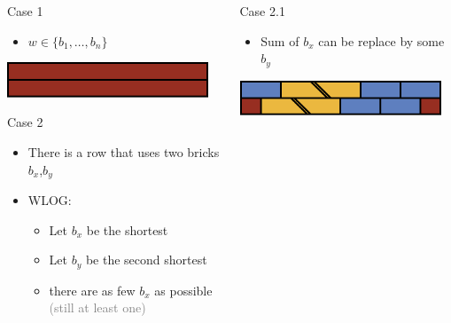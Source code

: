 \begin{frame}
	\frametitle{\problemtitle}
	\begin{columns}
		\begin{column}{0.4643\textwidth}
			\begin{block}{Case 1}
				\begin{itemize}
					\item $w\in\{b_1,\dots,b_n\}$
				\end{itemize}
				\vspace*{-0.5\baselineskip}
				\centering
				\includegraphics[width=0.94\textwidth]{case1}
			\end{block}			
			\pause
			\begin{block}{Case 2}
				\begin{itemize}
					\item There is a row that uses two bricks $b_x$,$b_y$
					\pause
					\item WLOG:
					\begin{itemize}
						\item Let $b_x$ be the shortest
						\item Let $b_y$ be the second shortest
						\item there are as few $b_x$ as possible\\
						\textcolor{gray}{(still at least one)}
					\end{itemize}
				\end{itemize}
			\end{block}
		\end{column}
		\begin{column}{0.4643\textwidth}
			\pause
			\begin{block}{Case 2.1}
				\begin{itemize}
					\item Sum of $b_x$ can be replace by some $b_y$
				\end{itemize}
				\vspace*{-0.5\baselineskip}
				\centering
				\includegraphics[width=0.94\textwidth]{case2.1}

\end{block}
\end{column}
\end{columns}
\end{frame}
